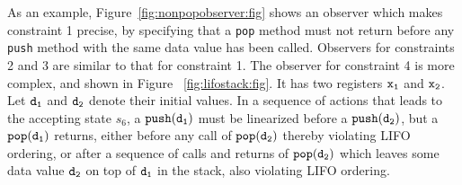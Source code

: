 As an example, Figure~\ref{fig:nonpopobserver:fig} shows an observer which
makes constraint 1 precise, by specifying
that a {\tt pop} method must not return before any {\tt push} method
with the same data value has been called.
Observers for constraints 2 and 3 are similar to that for constraint 1.
The observer for constraint 4 is more complex,
and shown in Figure ~\ref{fig:lifostack:fig}.
It has two registers $\tt x_1$ and $\tt x_2$. Let $\tt d_1$ and $\tt d_2$
denote their initial values.
In a sequence of actions that leads to the accepting state $s_6$, a
${\tt push(d_1)}$ must be linearized before a ${\tt push(d_2)}$, but
a ${\tt pop(d_1)}$ returns, either before any call of ${\tt pop(d_2)}$
thereby violating LIFO ordering, or after a sequence of calls and returns of
${\tt pop(d_2)}$ which leaves some data value $\tt d_2$ on top of
$\tt d_1$ in the stack, also violating LIFO ordering.
